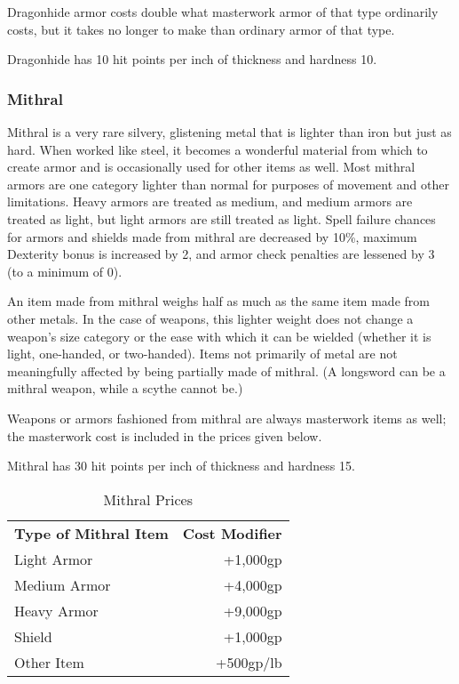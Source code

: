 Dragonhide armor costs double what masterwork armor of that type ordinarily costs, 
but it takes no longer to make than ordinary armor of that type.

Dragonhide has 10 hit points per inch of thickness and hardness 10.

\subsubsection{Mithral}

Mithral is a very rare silvery, glistening metal that is lighter 
than iron but just as hard. When worked like steel, it becomes a wonderful material 
from which to create armor and is occasionally used for other items as well. Most 
mithral armors are one category lighter than normal for purposes of movement and 
other limitations. Heavy armors are treated as medium, and medium armors are treated 
as light, but light armors are still treated as light. Spell failure chances for 
armors and shields made from mithral are decreased by 10\%, maximum Dexterity bonus 
is increased by 2, and armor check penalties are lessened by 3 (to a minimum of 
0).

An item made from mithral weighs half as much as the same item made from other 
metals. In the case of weapons, this lighter weight does not change a weapon's 
size category or the ease with which it can be wielded (whether it is light, one-handed, 
or two-handed). Items not primarily of metal are not meaningfully affected by being 
partially made of mithral. (A longsword can be a mithral weapon, while a scythe 
cannot be.)

Weapons or armors fashioned from mithral are always masterwork items as well; the 
masterwork cost is included in the prices given below.

Mithral has 30 hit points per inch of thickness and hardness 15.

\begin{table}[htb]
\caption{Mithral Prices}
\centering
\begin{tabular}{l r}
\textbf{Type of Mithral Item} & \textbf{Cost Modifier}\\
Light Armor & +1,000gp\\
Medium Armor & +4,000gp\\
Heavy Armor & +9,000gp\\
Shield & +1,000gp\\
Other Item & +500gp/lb\\
\end{tabular}
\end{table}